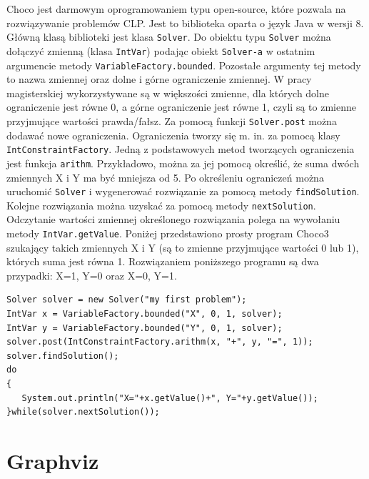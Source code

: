 Choco\cite{Choco3} jest darmowym oprogramowaniem typu open-source, które pozwala na rozwiązywanie problemów CLP. Jest to biblioteka oparta o język Java w wersji 8. Główną klasą biblioteki jest klasa \texttt{Solver}. 
Do obiektu typu \texttt{Solver} można dołączyć zmienną (klasa \texttt{IntVar}) podając obiekt \texttt{Solver-a} w ostatnim argumencie metody \texttt{VariableFactory.bounded}. Pozostałe argumenty tej metody to nazwa zmiennej oraz dolne i górne ograniczenie zmiennej. W pracy magisterskiej wykorzystywane są w większości zmienne, dla których dolne ograniczenie jest równe 0, a górne ograniczenie jest równe 1, czyli są to zmienne przyjmujące wartości prawda/fałsz. Za pomocą funkcji \texttt{Solver.post} można dodawać nowe ograniczenia. Ograniczenia tworzy się m. in. za pomocą klasy \texttt{IntConstraintFactory}. Jedną z podstawowych metod tworzących ograniczenia jest funkcja \texttt{arithm}. Przykładowo, można za jej pomocą określić, że suma dwóch zmiennych X i Y ma być mniejsza od 5. Po określeniu ograniczeń można uruchomić \texttt{Solver} i wygenerować rozwiązanie za pomocą metody \texttt{findSolution}. Kolejne rozwiązania można uzyskać za pomocą metody \texttt{nextSolution}. Odczytanie wartości zmiennej określonego rozwiązania polega na wywołaniu metody \texttt{IntVar.getValue}. 
Poniżej przedstawiono prosty program Choco3 szukający takich zmiennych X i Y (są to zmienne przyjmujące wartości 0 lub 1), których suma jest równa 1. Rozwiązaniem poniższego programu są dwa przypadki: X=1, Y=0 oraz X=0, Y=1.
\begin{verbatim}
Solver solver = new Solver("my first problem");
IntVar x = VariableFactory.bounded("X", 0, 1, solver);
IntVar y = VariableFactory.bounded("Y", 0, 1, solver);
solver.post(IntConstraintFactory.arithm(x, "+", y, "=", 1));
solver.findSolution();
do
{
   System.out.println("X="+x.getValue()+", Y="+y.getValue());
}while(solver.nextSolution());
\end{verbatim}


\section{Graphviz}


